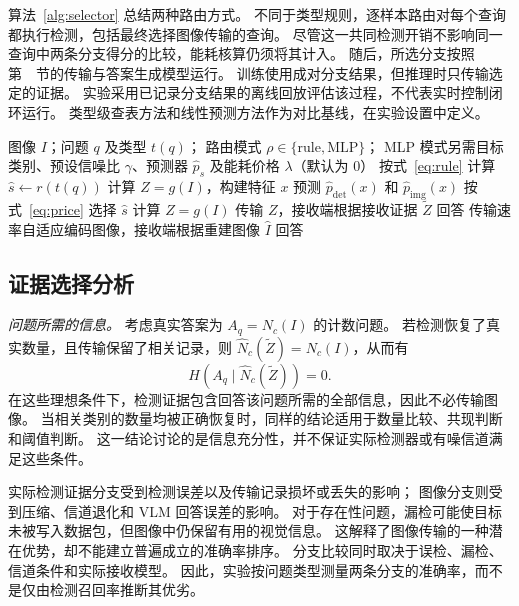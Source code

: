 算法~\ref{alg:selector} 总结两种路由方式。
不同于类型规则，逐样本路由对每个查询都执行检测，包括最终选择图像传输的查询。
尽管这一共同检测开销不影响同一查询中两条分支得分的比较，能耗核算仍须将其计入。
随后，所选分支按照第~~节的传输与答案生成模型运行。
训练使用成对分支结果，但推理时只传输选定的证据。
实验采用已记录分支结果的离线回放评估该过程，不代表实时控制闭环运行。
类型级查表方法和线性预测方法作为对比基线，在实验设置中定义。

\begin{algorithm}[t]
\caption{单次查询的问题条件证据路由}
\label{alg:selector}
\begin{algorithmic}[1]
\REQUIRE 图像 $I$；问题 $q$ 及类型 $t(q)$；
路由模式 $\rho\in\{\mathrm{rule},\mathrm{MLP}\}$；
MLP 模式另需目标类别、预设信噪比 $\gamma$、预测器
$\widehat p_s$ 及能耗价格 $\lambda$（默认为 $0$）
  \STATE 按式~\eqref{eq:rule} 计算 $\widehat s\leftarrow r(t(q))$
\ELSE
  \STATE 计算 $Z=g(I)$，构建特征 $x$
  \STATE 预测 $\widehat p_{\mathrm{det}}(x)$ 和 $\widehat p_{\mathrm{img}}(x)$
  \STATE 按式~\eqref{eq:price} 选择 $\widehat s$
\ENDIF
{}
    \STATE 计算 $Z=g(I)$
  \ENDIF
  \STATE 传输 $Z$，接收端根据接收证据 $\widetilde Z$ 回答
\ELSE
  \STATE 传输速率自适应编码图像，接收端根据重建图像 $\widehat I$ 回答
\ENDIF
\end{algorithmic}
\end{algorithm}

\subsection{证据选择分析}

\emph{问题所需的信息。}
考虑真实答案为 $A_q=N_c(I)$ 的计数问题。
若检测恢复了真实数量，且传输保留了相关记录，则
$\widehat N_c(\widetilde Z)=N_c(I)$，从而有
\begin{equation}
H\!\left(A_q\mid\widehat N_c(\widetilde Z)\right)=0.
\end{equation}
在这些理想条件下，检测证据包含回答该问题所需的全部信息，因此不必传输图像。
当相关类别的数量均被正确恢复时，同样的结论适用于数量比较、共现判断和阈值判断。
这一结论讨论的是信息充分性，并不保证实际检测器或有噪信道满足这些条件。

实际检测证据分支受到检测误差以及传输记录损坏或丢失的影响；
图像分支则受到压缩、信道退化和 VLM 回答误差的影响。
对于存在性问题，漏检可能使目标未被写入数据包，但图像中仍保留有用的视觉信息。
这解释了图像传输的一种潜在优势，却不能建立普遍成立的准确率排序。
分支比较同时取决于误检、漏检、信道条件和实际接收模型。
因此，实验按问题类型测量两条分支的准确率，而不是仅由检测召回率推断其优劣。


